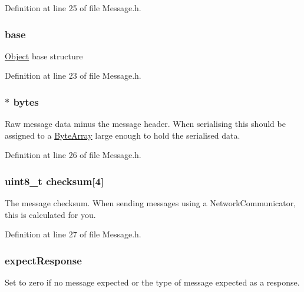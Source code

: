 Definition at line 25 of file Message.h.

\hypertarget{struct_m_i_message_ad0814be49cef65d1662b278c4c591509}{
\subsubsection[{base}]{ {\bf base}}}
\label{struct_m_i_message_ad0814be49cef65d1662b278c4c591509}
\hyperlink{struct_m_i_object}{Object} base structure 

Definition at line 23 of file Message.h.

\hypertarget{struct_m_i_message_a8fb493ee3c32dd3a9fb29bc71c852f86}{
\subsubsection[{bytes}]{$\ast$ {\bf bytes}}}
\label{struct_m_i_message_a8fb493ee3c32dd3a9fb29bc71c852f86}
Raw message data minus the message header. When serialising this should be assigned to a \hyperlink{struct_m_i_byte_array}{ByteArray} large enough to hold the serialised data. 

Definition at line 26 of file Message.h.

\hypertarget{struct_m_i_message_a02d93e565ee31bda6e0211dca9b42be5}{
\subsubsection[{checksum}]{\setlength{\rightskip}{0pt plus 5cm}uint8\_\-t {\bf checksum}\mbox{[}4\mbox{]}}}
\label{struct_m_i_message_a02d93e565ee31bda6e0211dca9b42be5}
The message checksum. When sending messages using a NetworkCommunicator, this is calculated for you. 

Definition at line 27 of file Message.h.

\hypertarget{struct_m_i_message_ac9d8ec2cdfb3a4cc93366b3f5742f527}{
\subsubsection[{expectResponse}]{ {\bf expectResponse}}}
\label{struct_m_i_message_ac9d8ec2cdfb3a4cc93366b3f5742f527}
Set to zero if no message expected or the type of message expected as a response. 

